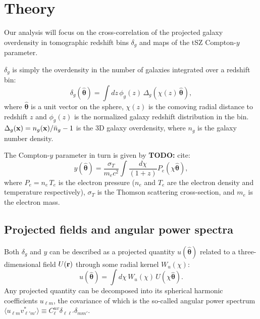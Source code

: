 \documentclass[useAMS,usenatbib]{mn2e}
\newcommand{\nv}{\hat{\boldsymbol{\theta}}}
\newcommand{\todo}[1]{{\bf TODO:} #1}
\begin{document}
\section{Theory}\label{sec:theory}
    Our analysis will focus on the cross-correlation of the projected galaxy overdensity in tomographic redshift bins $\delta_g$ and maps of the tSZ Compton-$y$ parameter.
    
    $\delta_g$ is simply the overdensity in the number of galaxies integrated over a redshift bin:
    \begin{equation}
      \delta_g(\nv)=\int dz\,\phi_g(z)\,\Delta_g(\chi(z)\,\nv),
    \end{equation}
    where $\nv$ is a unit vector on the sphere, $\chi(z)$ is the comoving radial distance to redshift $z$ and $\phi_g(z)$ is the normalized galaxy redshift distribution in the bin. $\Delta_g({\bf x})=n_g({\bf x})/\bar{n}_g-1$ is the 3D galaxy overdensity, where $n_g$ is the galaxy number density.
    
    The Compton-$y$ parameter in turn is given by \todo{cite}:
    \begin{equation}
      y(\nv)=\frac{\sigma_T}{m_ec^2}\int \frac{d\chi}{(1+z)} P_e(\chi\nv),
    \end{equation}
    where $P_e=n_e\,T_e$ is the electron pressure ($n_e$ and $T_e$ are the electron density and temperature respectively), $\sigma_T$ is the Thomson scattering cross-section, and $m_e$ is the electron mass.
    
  \subsection{Projected fields and angular power spectra}\label{ssec:theory.cls}    
    Both $\delta_g$ and $y$ can be described as a projected quantity $u(\nv)$ related to a three-dimensional field $U({\bf r})$ through some radial kernel $W_u(\chi)$:
    \begin{equation}
      u(\nv)=\int d\chi\,W_u(\chi)\,U(\chi\nv).
    \end{equation}
    Any projected quantity can be decomposed into its spherical harmonic coefficients $u_{\ell m}$, the covariance of which is the so-called angular power spectrum $\langle u_{\ell m}v^*_{\ell' m'}\rangle\equiv C^{uv}_\ell\delta_{\ell\ell'}\delta_{mm'}$.
\end{document}
